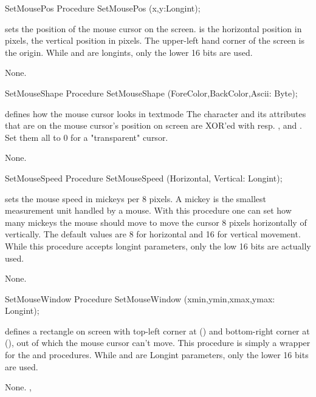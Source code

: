 
\begin{procedure}{SetMousePos}
\Declaration
Procedure SetMousePos (x,y:Longint);

\Description

 sets the position of the mouse cursor on the screen.
 is the horizontal position in pixels,  the vertical position
in pixels. The upper-left hand corner of the screen is the origin.
While  and  are longints, only the lower 16 bits are used.

\Errors
None.
\SeeAlso
{}
\end{procedure}


\begin{procedure}{SetMouseShape}
\Declaration
Procedure SetMouseShape (ForeColor,BackColor,Ascii: Byte);

\Description

defines how the mouse cursor looks in textmode
The character and its attributes that are on the mouse cursor's position on
screen are XOR'ed with resp. ,  and
. Set them all to 0 for a "transparent" cursor.

\Errors
None.
\SeeAlso
{}
\end{procedure}


\begin{procedure}{SetMouseSpeed}
\Declaration
Procedure SetMouseSpeed (Horizontal, Vertical: Longint);

\Description

 sets the mouse speed in mickeys per 8 pixels.
A mickey is the smallest measurement unit handled by a mouse. With this
procedure one can set how many mickeys the mouse should move to move the
cursor 8 pixels horizontally of vertically. The default values are 8 for
horizontal and 16 for vertical movement.
While this procedure accepts longint parameters, only the low 16 bits are
actually used.

\Errors
None.
\SeeAlso

\end{procedure}


\begin{procedure}{SetMouseWindow}
\Declaration
Procedure SetMouseWindow (xmin,ymin,xmax,ymax: Longint);

\Description

defines a rectangle on screen with top-left corner at () and
bottom-right corner at (), out of which the mouse 
cursor can't move.
This procedure is simply a wrapper for the  and 
 procedures.
While  and  are Longint parameters, 
only the lower 16 bits are used.

\Errors
None.
\SeeAlso
{}, 
\end{procedure}

